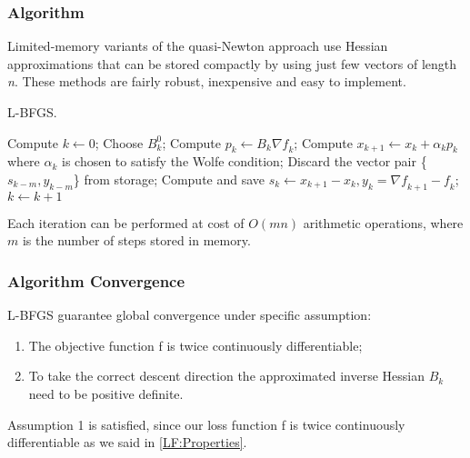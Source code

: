 \subsubsection{Algorithm}
Limited-memory variants  of  the  quasi-Newton  approach use  Hessian  approximations  that  can  be stored compactly by using just few vectors of length \textit{n}. These methods are fairly robust, inexpensive and easy to implement.

\begin{algorithm}[H]
	\caption{L-BFGS.}
	\label{alg:LBFGS}
	\begin{algorithmic}[4]
		\State Compute $k \gets 0$;
		\Repeat
		\State Choose \textbf{$B^0_k$};
		\State Compute $p_k \gets B_k\nabla \textit{f}_k$;
		\State Compute $x_{k+1} \gets x_{k}+ \alpha_{k}p_{k}$ where $\alpha_{k}$ is chosen to satisfy the Wolfe condition;
		\State Discard the vector pair \{$s_{k-m},y_{k-m}$\} from storage;
		\EndIf
		\State Compute and save $s_k \gets x_{k+1}-x_{k}, y_k=\nabla \textit{f}_{k+1}-\textit{f}_k$;
		\State $k \gets k+1$
		\EndProcedure 
	\end{algorithmic}
\end{algorithm}

Each iteration can be performed at cost of $O(mn)$ arithmetic operations, where $m$ is the number of steps stored in memory.

\subsubsection{Algorithm Convergence}
\label{L-BFGSConv}
L-BFGS guarantee global convergence under specific assumption:
\begin{enumerate} \label{convergence:assumption}
	\item The objective function f is twice continuously differentiable;
	\item To take the correct descent direction the approximated inverse Hessian $B_{k}$ need to be positive definite.
\end{enumerate}


Assumption 1 is satisfied, since our loss function f is twice continuously differentiable as we said in \ref{LF:Properties}. 
                                                       
